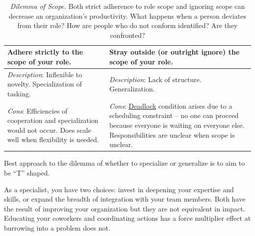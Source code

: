 \begin{center}
\begin{table}[H] %
\begin{tabular}{ | m{\dilemmatablewidth}| m{\dilemmatablewidth} | }
  \hline
  \textbf{Adhere strictly to the scope of your role.} & 
  \textbf{Stray outside (or outright ignore) the scope of your role.} \\ 
  \hline
  \textit{Description}: Inflexible to novelty. Specialization of tasking. & 
  \textit{Description}: Lack of structure. Generalization. \\ 
  \hline
  \textit{Cons}: Efficiencies of cooperation and specialization would not occur. Does scale well when flexibility is needed.  & 
  \textit{Cons}: \href{https://en.wikipedia.org/wiki/Deadlock}{Deadlock} 
  \index{Wikipedia!\href{https://en.wikipedia.org/wiki/Deadlock}{Deadlock}}
  condition arises due to a scheduling constraint -- no one can proceed because everyone is waiting on everyone else. Responsibilities are unclear when scope is unclear. \\  
  \hline
\end{tabular}
\caption{
\textit{Dilemma of Scope.}
Both strict adherence to role scope and ignoring scope can decrease an organization's productivity. 
What happens when a person deviates from their role?
How are people who do not conform identified? Are they confronted?
}
\label{table:scope-of-activity}
\end{table}
\end{center}

Best approach to the dilemma of whether to specialize or generalize is to aim to be ``T'' shaped. 

As a specialist, you have two choices: invest in deepening your expertise and skills, or expand the breadth of integration with your team members. Both have the result of improving your organization but they are not equivalent in impact. Educating your coworkers and coordinating actions has a force multiplier effect at burrowing into a problem does not.



